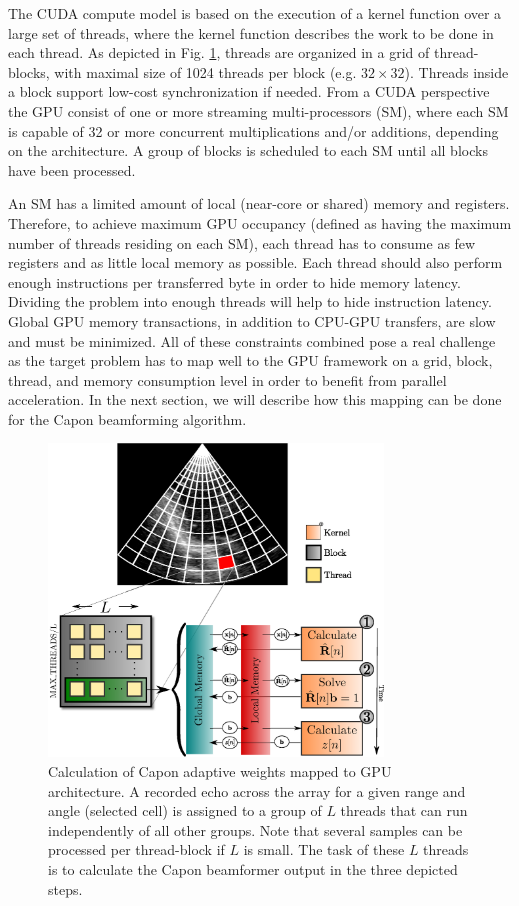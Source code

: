 \documentclass[journal]{IEEEtran}
\begin{document}
The CUDA compute model is based on the execution of a kernel function over a large set of threads, where the kernel function describes the work to be done in each thread. As depicted in Fig. \ref{fig:gpulayout}, threads are organized in a grid of thread-blocks, with maximal size of 1024 threads per block (e.g. $32\times32$). Threads inside a block support low-cost synchronization if needed. From a CUDA perspective the GPU consist of one or more streaming multi-processors (SM), where each SM is capable of 32 or more concurrent multiplications and/or additions, depending on the architecture. A group of blocks is scheduled to each SM until all blocks have been processed.

An SM has a limited amount of local (near-core or shared) memory and registers. Therefore, to achieve maximum GPU occupancy (defined as having the maximum number of threads residing on each SM), each thread has to consume as few registers and as little local memory as possible. Each thread should also perform enough instructions per transferred byte in order to hide memory latency. Dividing the problem into enough threads will help to hide instruction latency. Global GPU memory transactions, in addition to CPU-GPU transfers, are slow and must be minimized. All of these constraints combined pose a real challenge as the target problem has to map well to the GPU framework on a grid, block, thread, and memory consumption level in order to benefit from parallel acceleration. In the next section, we will describe how this mapping can be done for the Capon beamforming algorithm.    

\begin{figure}
\centerline{\includegraphics[width=3.5in]{gfx/gpu_layout_vertical.eps}}
\caption{Calculation of Capon adaptive weights mapped to GPU architecture. A recorded echo across the array for a given range and angle (selected cell) is assigned to a group of $L$ threads that can run independently of all other groups. Note that several samples can be processed per thread-block if $L$ is small. The task of these $L$ threads is to calculate the Capon beamformer output in the three depicted steps.}
\label{fig:gpulayout}
\end{figure}
\end{document}
